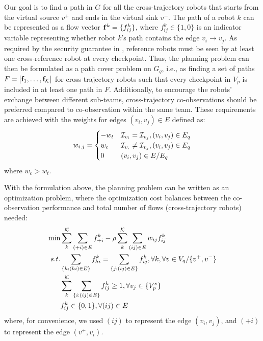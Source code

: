 \documentclass[journal]{IEEEtran}  %
\begin{document}
Our goal is to find a path in $G$ for all the cross-trajectory robots that starts from the virtual source $v^{+}$ and ends in the virtual sink $v^{-}$.
The path of a robot $k$ can be represented as a flow vector $\mathbf{f}^{k} = \{ f^{k}_{ij} \}$, where $f^{k}_{ij} \in \{1,0\}$ is an indicator variable representing whether robot $k$'s path contains the edge $v_{i}\to v_{j}$. 
As required by the security guarantee in , reference robots must be seen by at least one cross-reference robot at every checkpoint.
Thus, the planning problem can then be formulated as a path cover problem on $G_{q}$, i.e., as finding a set of paths $F=[\mathbf{f}_{1},\dots, \mathbf{f}_{\mathcal{K}}]$ for cross-trajectory robots such that every checkpoint in $V_{p}$ is included in at least one path in $F$. Additionally, to encourage the robots' exchange between different sub-teams, cross-trajectory co-observations should be preferred compared to co-observation within the same team. 
These requirements are achieved with the weights for edges $(v_{i},v_{j})\in E$ defined as:
\begin{equation}
	w_{i,j}=\begin{cases}
	-w_{t} & \mathcal{I}_{v_{i}}=\mathcal{I}_{v_{j}}, (v_{i},v_{j})\in E_{q}\\
	w_{c} & \mathcal{I}_{v_{i}} \neq \mathcal{I}_{v_{j}}, (v_{i},v_{j})\in E_{q}\\
	0 &  (v_{i},v_{j})\in E / E_{q} 
	\end{cases}
\end{equation}
where $w_{c} > w_{t}$. 

With the formulation above, the planning problem can be written as an optimization problem, where the optimization cost balances between the co-observation performance and total number of flows (cross-trajectory robots) needed:
 \begin{subequations} \label{eq:flow-coverage-problem}
     \begin{align}
        \min & \sum^{\mathcal{K}}_{k} \sum_{(+i)\in E} f^{k}_{+i} - \rho \sum^{\mathcal{K}}_k \sum_{(ij)\in E} w_{ij} f^k_{ij} \label{eq:flow-cost}\\
        s.t. & \sum_{\{h:(hi) \in E\}}f^k_{hi}=\sum_{\{j:(ij) \in E\}}f^k_{ij},  \forall k,\forall v \in V_{q} / \{v^{+}, v^{-}\}  \label{eq:FlowBalanceConstraint}\\
        & \sum^{\mathcal{K}}_k\sum_{\{i:(ij)\in E \}} f^k_{ij} \geq 1, \forall v_{j} \in \{V^{s}_{p}\} \label{eq:FlowCoverage}\\
        & f^k_{ij} \in \{0,1\} ,  \forall (ij)\in E\label{eq:SingleFLowCapacity}
     \end{align}
 \end{subequations}
where, for convenience, we used $(ij)$ to represent the edge $(v_{i},v_{j})$, and $(+i)$ to represent the edge $(v^{+},v_{i})$.
\end{document}
